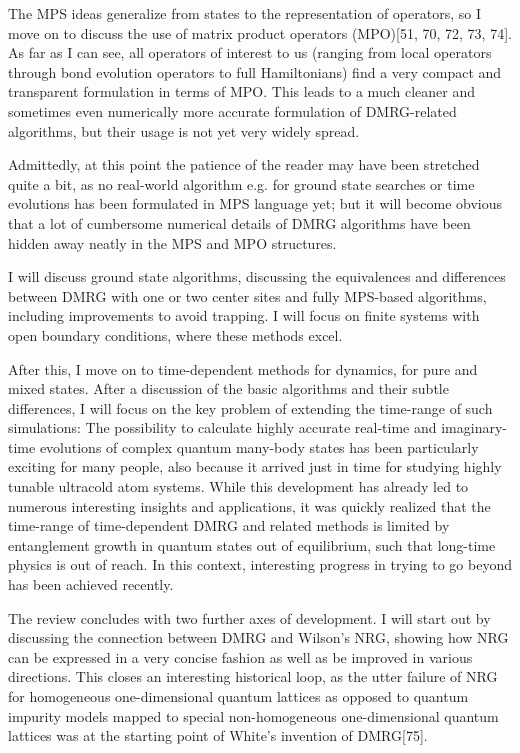 \documentclass[12pt]{article}
\begin{document}
The MPS ideas generalize from states to the representation of operators, so I move on to discuss the use of matrix product operators (MPO)[51, 70, 72, 73, 74]. As far as I can see, all operators of interest to us (ranging from local operators through bond evolution operators to full Hamiltonians) find a very compact and transparent formulation in terms of MPO. This leads to a much cleaner and sometimes even numerically more accurate formulation of DMRG-related algorithms, but their usage is not yet very widely spread.

Admittedly, at this point the patience of the reader may have been stretched quite a bit, as no real-world algorithm e.g. for ground state searches or time evolutions has been formulated in MPS language yet; but it will become obvious that a lot of cumbersome numerical details of DMRG algorithms have been hidden away neatly in the MPS and MPO structures.

I will discuss ground state algorithms, discussing the equivalences and differences between DMRG with one or two center sites and fully MPS-based algorithms, including improvements to avoid trapping. I will focus on finite systems with open boundary conditions, where these methods excel.

After this, I move on to time-dependent methods for dynamics, for pure and mixed states. After a discussion of the basic algorithms and their subtle differences, I will focus on the key problem of extending the time-range of such simulations: The possibility to calculate highly accurate real-time and imaginary-time evolutions of complex quantum many-body states has been particularly exciting for many people, also because it arrived just in time for studying highly tunable ultracold atom systems. While this development has already led to numerous interesting insights and applications, it was quickly realized that the time-range of time-dependent DMRG and related methods is limited by entanglement growth in quantum states out of equilibrium, such that long-time physics is out of reach. In this context, interesting progress in trying to go beyond has been achieved recently.

The review concludes with two further axes of development. I will start out by discussing the connection between DMRG and Wilson's NRG, showing how NRG can be expressed in a very concise fashion as well as be improved in various directions. This closes an interesting historical loop, as the utter failure of NRG for homogeneous one-dimensional quantum lattices as opposed to quantum impurity models mapped to special non-homogeneous one-dimensional quantum lattices was at the starting point of White's invention of DMRG[75].
\end{document}
